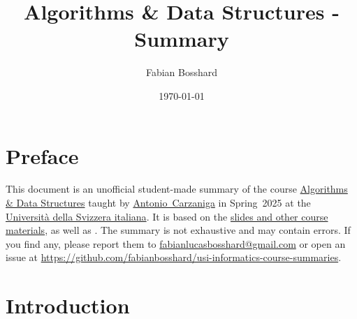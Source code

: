 \usepackage[backend=biber,style=numeric]{biblatex}



\usepackage[
  pdfauthor={Fabian Bosshard},
  pdftitle={USI - Algorithms and Data Structures - Course Summary},
  pdfkeywords={USI, algorithms and data structures, course summary, informatics},
  colorlinks=false,        %
  pdfborder={0 0 0}        %
]{hyperref}
\usepackage[
  type     = {CC},
  modifier = {by},
  version  = {4.0},
]{doclicense}



\title{Algorithms \& Data Structures - Summary}
\author{Fabian Bosshard}
\date{\today}







\maketitle
\tableofcontents

\section*{Preface}

This document is an unofficial student-made summary of the course
\href{https://search.usi.ch/en/courses/35270741/algorithms-data-structures}{{Algorithms \& Data Structures}} taught by \href{https://www.inf.usi.ch/carzaniga/}{Antonio~Carzaniga} in Spring~2025 at the \href{https://www.usi.ch/en}{Università della Svizzera italiana}.
It is based on the \href{https://www.inf.usi.ch/carzaniga/edu/algo24s/index.html}{slides and other course materials}, as well as \cite{clrs2022}.
The summary is not exhaustive and may contain errors.
If you find any, please report them to \href{mailto:fabianlucasbosshard@gmail.com}{fabianlucasbosshard@gmail.com} or open an issue at \url{https://github.com/fabianbosshard/usi-informatics-course-summaries}.

\doclicenseThis

\printbibliography[heading=bibintoc,title={References}]



\section{Introduction}


